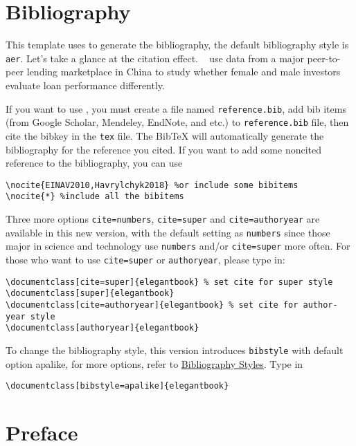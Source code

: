 \documentclass[11pt]{elegantbook}
\begin{document}
\section{Bibliography}

This template uses  to generate the bibliography, the default bibliography style is \lstinline{aer}. Let's take a glance at the citation effect. ~\cite{en1} use data from a major peer-to-peer lending marketplace in China to study whether female and male investors evaluate loan performance differently. 

If you want to use , you must create a file named \lstinline{reference.bib}, add bib items (from Google Scholar, Mendeley, EndNote, and etc.) to \lstinline{reference.bib} file, then cite the bibkey in the \lstinline{tex} file. The Bib\TeX{} will automatically generate the bibliography for the reference you cited. If you want to add some noncited reference to the bibliography, you can use 
\begin{lstlisting}[frame=single]
\nocite{EINAV2010,Havrylchyk2018} %or include some bibitems
\nocite{*} %include all the bibitems
\end{lstlisting}

Three more options \lstinline{cite=numbers}, \lstinline{cite=super} and \lstinline{cite=authoryear} are available in this new version, with the default setting as \lstinline{numbers} since those major in science and technology use \lstinline{numbers} and/or \lstinline{cite=super} more often. For those who want to use \lstinline{cite=super} or \lstinline{authoryear}, please type in:
\begin{lstlisting}
\documentclass[cite=super]{elegantbook} % set cite for super style 
\documentclass[super]{elegantbook}
\documentclass[cite=authoryear]{elegantbook} % set cite for author-year style
\documentclass[authoryear]{elegantbook}
\end{lstlisting}

To change the bibliography style, this version introduces \lstinline{bibstyle} with default option apalike, for more options, refer to \href{https://www.overleaf.com/learn/latex/Bibtex_bibliography_styles}{ Bibliography Styles}. Type in
\begin{lstlisting}
\documentclass[bibstyle=apalike]{elegantbook} 
\end{lstlisting}

\section{Preface}
\end{document}
